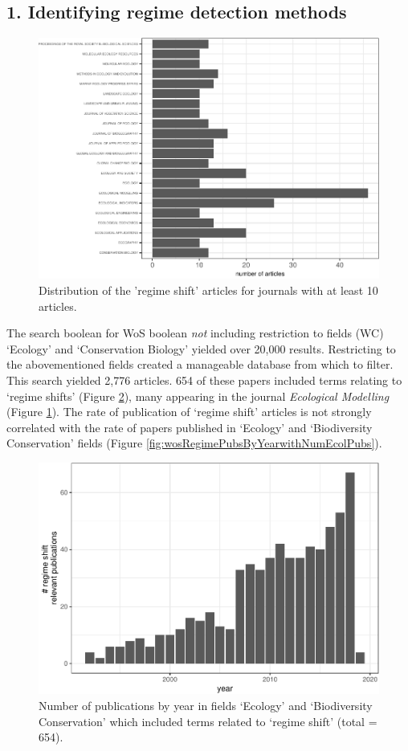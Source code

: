 \documentclass[12pt,twoside,openany]{reedthesis}
\begin{document}
\hypertarget{identifying-regime-detection-methods-1}{%
\subsection{1. Identifying regime detection methods}\label{identifying-regime-detection-methods-1}}
\begin{figure}
\includegraphics[width=0.85\linewidth]{_myDissertation_files/figure-latex/wosRegimePubsByJrnlmin10Pubs-1} \caption{Distribution of the 'regime shift' articles for journals with at least 10 articles.}\label{fig:wosRegimePubsByJrnlmin10Pubs}
\end{figure}
The search boolean for WoS boolean \emph{not} including restriction to fields (WC) `Ecology' and `Conservation Biology' yielded over 20,000 results. Restricting to the abovementioned fields created a manageable database from which to filter. This search yielded 2,776 articles. 654 of these papers included terms relating to `regime shifts' (Figure \ref{fig:wosRegimePubsByYear}), many appearing in the journal \emph{Ecological Modelling} (Figure \ref{fig:wosRegimePubsByJrnlmin10Pubs}). The rate of publication of `regime shift' articles is not strongly correlated with the rate of papers published in `Ecology' and `Biodiversity Conservation' fields (Figure \ref{fig:wosRegimePubsByYearwithNumEcolPubs}).
\begin{figure}
\centering
\includegraphics{_myDissertation_files/figure-latex/wosRegimePubsByYear-1.pdf}
\caption{\label{fig:wosRegimePubsByYear}Number of publications by year in fields `Ecology' and `Biodiversity Conservation' which included terms related to `regime shift' (total = 654).}
\end{figure}
\end{document}
